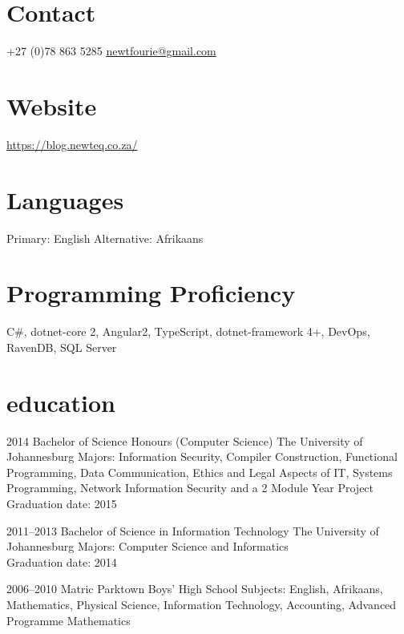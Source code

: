 \documentclass[]{friggeri-cv} %
\begin{document}


\begin{aside} %
\section{Contact}
+27 (0)78 863 5285
\href{mailto:newtfourie@gmail.com}{newtfourie@gmail.com}
\section{Website}
\href{https://blog.newteq.co.za/}{https://blog.newteq.co.za/}
\section{Languages}
Primary: English
Alternative: Afrikaans
\section{Programming Proficiency}
C\#, dotnet-core 2,
Angular2, TypeScript,
dotnet-framework 4+,
DevOps,
RavenDB, SQL Server
\end{aside}


\section{education}

\begin{entrylist}

\entry
{2014}
{Bachelor of Science Honours (Computer Science)}
{The University of Johannesburg}
{Majors: Information Security, Compiler Construction, Functional Programming, Data Communication, Ethics and Legal Aspects of IT, Systems Programming, Network Information Security and a 2 Module Year Project\\
Graduation date: 2015}

\entry
{2011--2013}
{Bachelor of Science in Information Technology}
{The University of Johannesburg}
{Majors: Computer Science and Informatics\\
Graduation date: 2014}

\entry
{2006--2010}
{Matric}
{Parktown Boys' High School}
{Subjects: English, Afrikaans, Mathematics, Physical Science, Information Technology, Accounting, Advanced Programme Mathematics}

\end{entrylist}
\end{document}
